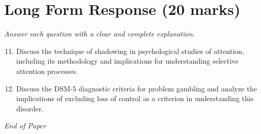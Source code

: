 \documentclass[12pt]{article}
\begin{document}
\section*{Long Form Response (20 marks)}
\textit{Answer each question with a clear and complete explanation.}
\begin{enumerate}[label=\arabic*.]
\setcounter{enumi}{10}
\item Discuss the technique of shadowing in psychological studies of attention, including its methodology and implications for understanding selective attention processes.
\item Discuss the DSM-5 diagnostic criteria for problem gambling and analyze the implications of excluding loss of control as a criterion in understanding this disorder.
\end{enumerate}

\vfill
\noindent\textit{End of Paper}
\end{document}
